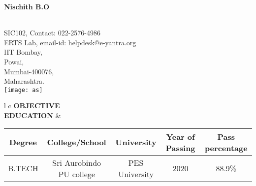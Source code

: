 \documentclass[1pt]{article}
\begin{document}
	\begin{center}
	{\large \textbf{Nischith B.O}}\\
		\noindent\hrulefill\\
	\end{center}
	SIC102, \hfill Contact: 022-2576-4986\\
	ERTS Lab, \hfill email-id: helpdesk@e-yantra.org\\
	IIT Bombay,\hfill \\ Powai,\hfill \\ Mumbai-400076,\hfill \\ Maharashtra.\\
	
	\hfill \texttt{[image: as]}
	
	\begin{flushleft}
			\resizebox{13cm}{!}
			{
				\begin{tabular}{l c}
						\textbf{OBJECTIVE}\\\textbf{EDUCATION} & 	\begin{tabular}{|c|c|c|c|c|}
												\hline
												Degree & College/School & University & Year of Passing & Pass percentage\\
												\hline
												B.TECH & Sri Aurobindo PU college & PES University & 2020 & 88.9\% \\
												\hline	
												\end{tabular}
					
				\end{tabular}
			}
				
			\hspace{1cm}\\
			\hspace{1cm}\\
			

\end{flushleft}
\end{document}
